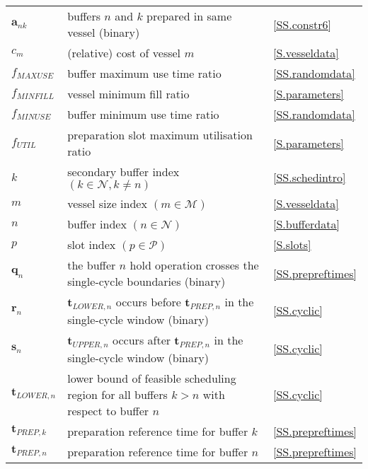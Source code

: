 {\begin{longtabu} to 
     &  & \\\hline
    \endhead
    $\boldsymbol{a}_{nk}$ & buffers $n$ and $k$ prepared in same
    vessel (binary) & \ref{SS.constr6}\\
    $c_{m}$ & (relative) cost of vessel $m$ & \ref{S.vesseldata}\\
    $f_{\mathit{MAXUSE}}$ & buffer maximum use time ratio 
        & \ref{SS.randomdata}\\
    $f_{\mathit{MINFILL}}$ & vessel minimum fill ratio & \ref{S.parameters}\\
    $f_{\mathit{MINUSE}}$ & buffer minimum use time ratio 
        & \ref{SS.randomdata}\\
    $f_{\mathit{UTIL}}$ & preparation slot maximum utilisation ratio
        & \ref{S.parameters}\\
    $k$ & secondary buffer index $\left( k \in \mathcal{N}, k \ne n \right)$
        & \ref{SS.schedintro}\\
    $m$ & vessel size index $\left( m \in \mathcal{M} \right)$ 
        & \ref{S.vesseldata}\\
    $n$ & buffer index $\left( n \in \mathcal{N} \right)$ 
        & \ref{S.bufferdata}\\
    $p$ & slot index $\left( p \in \mathcal{P} \right)$ & \ref{S.slots}\\
    $\boldsymbol{q}_{n}$ & the buffer $n$ hold operation crosses the
        single-cycle boundaries (binary) & \ref{SS.prepreftimes}\\
    $\boldsymbol{r}_{n}$ & $\boldsymbol{t}_{\mathit{LOWER},n}$ occurs before
        $\boldsymbol{t}_{\mathit{PREP},n}$ in the single-cycle window (binary)
        & \ref{SS.cyclic}\\
    $\boldsymbol{s}_{n}$ &
        $\boldsymbol{t}_{\mathit{UPPER},n}$ occurs after
        $\boldsymbol{t}_{\mathit{PREP},n}$ in the single-cycle window (binary)
        & \ref{SS.cyclic}\\
    $\boldsymbol{t}_{\mathit{LOWER},n}$ & lower bound of feasible scheduling
        region for all buffers $k > n$ with respect to buffer $n$
        & \ref{SS.cyclic}\\
    $\boldsymbol{t}_{\mathit{PREP},k}$ & preparation reference time for buffer
        $k$ & \ref{SS.prepreftimes}\\
    $\boldsymbol{t}_{\mathit{PREP},n}$ & preparation reference time for buffer
        $n$ & \ref{SS.prepreftimes}\\

\end{longtabu}}
